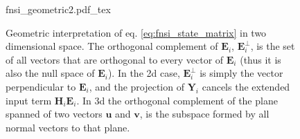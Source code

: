 \begin{figure}[!ht]
  \centering
  {fnsi_geometric2.pdf_tex}
  \caption{Geometric interpretation of eq. \eqref{eq:fnsi_state_matrix} in two
    dimensional space. The orthogonal complement of $\bm E_i$, $\bm E_i^\perp$,
    is the set of all vectors that are orthogonal to every vector of $\bm E_i$
    (thus it is also the null space of $\bm E_i$).
    In the 2d case, $\bm E_i^\perp$ is simply the vector perpendicular to $\bm
    E_i$, and the projection of $\bm Y_i$ cancels the extended input term $\bm
    H_i \bm E_i$. In 3d the orthogonal complement of the plane spanned of two
    vectors $\bm u$ and $\bm v$, is the subspace formed by all normal vectors to
    that plane.
  }
  \label{fig:fnsi_geometric}
\end{figure}


